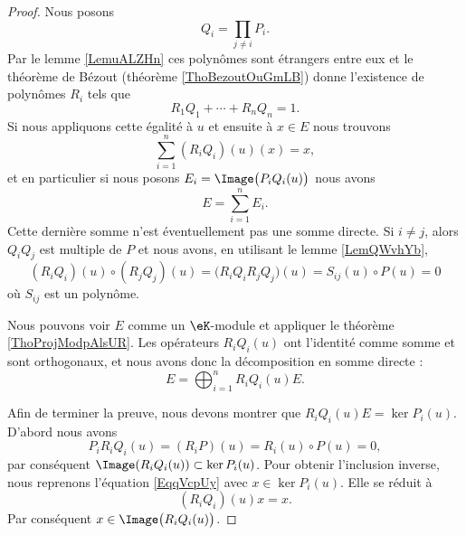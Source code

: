 \begin{proof}
    Nous posons 
    \begin{equation}
        Q_i=\prod_{j\neq i}P_i.
    \end{equation}
    Par le lemme \ref{LemuALZHn} ces polynômes sont étrangers entre eux et le théorème de Bézout (théorème \ref{ThoBezoutOuGmLB}) donne l'existence de polynômes \( R_i\) tels que
    \begin{equation}
        R_1Q_1+\cdots+R_nQ_n=1.
    \end{equation}
    Si nous appliquons cette égalité à \( u\) et ensuite à \( x\in E\) nous trouvons
    \begin{equation}        \label{EqqVcpUy}
        \sum_{i=1}^n(R_iQ_i)(u)(x)=x,
    \end{equation}
    et en particulier si nous posons \( E_i=\Image\big(P_iQ_i(u)\big)\) nous avons
    \begin{equation}
        E=\sum_{i=1}^nE_i.
    \end{equation}
    Cette dernière somme n'est éventuellement pas une somme directe. Si \( i\neq j\), alors \( Q_iQ_j\) est multiple de \( P\) et nous avons, en utilisant le lemme \ref{LemQWvhYb}, 
    \begin{equation}
        (R_iQ_i)(u)\circ (R_jQ_j)(u)=\big( R_iQ_iR_jQ_j \big)(u)=S_{ij}(u)\circ P(u)=0
    \end{equation}
    où \( S_{ij}\) est un polynôme. 

    Nous pouvons voir \( E\) comme un \( \eK\)-module et appliquer le théorème \ref{ThoProjModpAlsUR}. Les opérateurs \( R_iQ_i(u)\) ont l'identité comme somme et sont orthogonaux, et nous avons donc la décomposition en somme directe :
    \begin{equation}
        E=\bigoplus_{i=1}^nR_iQ_i(u)E.
    \end{equation}

    Afin de terminer la preuve, nous devons montrer que \( R_iQ_i(u)E=\ker P_i(u)\). D'abord nous avons
    \begin{equation}
        P_iR_iQ_i(u)=(R_iP)(u)=R_i(u)\circ P(u)=0,
    \end{equation}
    par conséquent \( \Image(R_iQ_i(u))\subset \ker P_i(u)\). Pour obtenir l'inclusion inverse, nous reprenons l'équation \eqref{EqqVcpUy} avec \( x\in\ker P_i(u)\). Elle se réduit à
    \begin{equation}
        (R_iQ_i)(u)x=x.
    \end{equation}
    Par conséquent \( x\in\Image\big( R_iQ_i(u) \big)\).
\end{proof}

